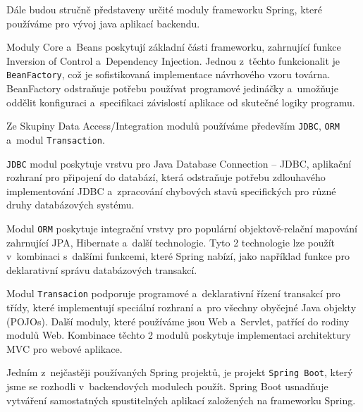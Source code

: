 \documentclass[twoside, 12pt]{article}
\begin{document}
{\cite{springFrameworkDocs}

\obrazek
{}

Dále budou stručně představeny určité moduly frameworku Spring,
které používáme pro vývoj java aplikací backendu.

Moduly Core a~Beans poskytují základní části frameworku,
zahrnující funkce Inversion of Control a~Dependency Injection.
Jednou z~těchto funkcionalit je \texttt{BeanFactory},
což je sofistikovaná implementace návrhového vzoru továrna.
BeanFactory odstraňuje potřebu používat programové jedináčky
a~umožňuje oddělit konfiguraci a~specifikaci závislostí aplikace od skutečné logiky programu.


Ze Skupiny Data Access/Integration modulů používáme především \texttt{JDBC}, \texttt{ORM}
a~modul \texttt{Transaction}.

\texttt{JDBC} modul poskytuje vrstvu pro Java Database Connection
-- JDBC, aplikační rozhraní pro připojení do databází,
která odstraňuje potřebu zdlouhavého implementování JDBC
a~zpracování chybových stavů specifických pro různé druhy databázových systému.

Modul \texttt{ORM} poskytuje integrační vrstvy pro populární objektově-relační mapování
zahrnující JPA, Hibernate a~další technologie.
Tyto 2 technologie lze použít v~kombinaci s~dalšími funkcemi, které Spring nabízí,
jako například funkce pro deklarativní správu databázových transakcí.

Modul \texttt{Transacion} podporuje programové a~deklarativní řízení
transakcí pro třídy, které implementují speciální rozhraní
a~pro všechny obyčejné Java objekty (POJOs).
Další moduly, které používáme jsou Web a~Servlet, patřící do rodiny modulů Web.
Kombinace těchto 2 modulů poskytuje implementaci architektury MVC
pro webové aplikace.
\cite{springFrameworkDocs}

Jedním z~nejčastěji používaných Spring projektů,
je projekt \texttt{Spring Boot}, který jsme se rozhodli v~backendových modulech použít.
Spring Boot usnadňuje vytváření samostatných spustitelných aplikací
založených na frameworku Spring.
\cite{springbootDocs}


}
\end{document}
